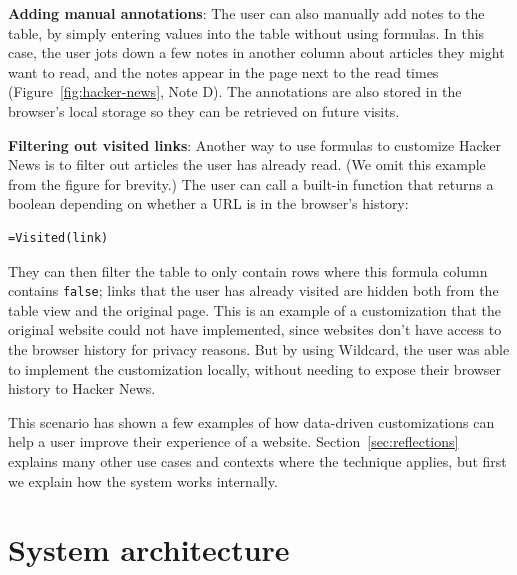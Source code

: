 \documentclass[sigplan,screen,10pt,anonymous,review]{acmart}
\begin{document}
\textbf{Adding manual annotations}: The user can also manually add notes
to the table, by simply entering values into the table without using
formulas. In this case, the user jots down a few notes in another column
about articles they might want to read, and the notes appear in the page
next to the read times (Figure~\ref{fig:hacker-news}, Note D). The
annotations are also stored in the browser's local storage so they can
be retrieved on future visits.

\textbf{Filtering out visited links}: Another way to use formulas to
customize Hacker News is to filter out articles the user has already
read. (We omit this example from the figure for brevity.) The user can
call a built-in function that returns a boolean depending on whether a
URL is in the browser's history:

\begin{verbatim}
=Visited(link)
\end{verbatim}

They can then filter the table to only contain rows where this formula
column contains \texttt{false}; links that the user has already visited
are hidden both from the table view and the original page. This is an
example of a customization that the original website could not have
implemented, since websites don't have access to the browser history for
privacy reasons. But by using Wildcard, the user was able to implement
the customization locally, without needing to expose their browser
history to Hacker News.

This scenario has shown a few examples of how data-driven customizations
can help a user improve their experience of a website.
Section~\ref{sec:reflections} explains many other use cases and contexts
where the technique applies, but first we explain how the system works
internally.

\hypertarget{sec:architecture}{%
\section{System architecture}\label{sec:architecture}}
\end{document}
